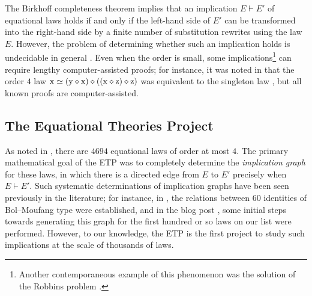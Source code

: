 The Birkhoff completeness theorem \cite[Th. 3.5.14]{term-rewriting} implies that an implication $E \vdash E'$ of equational laws holds if and only if the left-hand side of $E'$ can be transformed into the right-hand side by a finite number of substitution rewrites using the law $E$. However, the problem of determining whether such an implication holds is undecidable in general \cite{mckenzie}. Even when the order is small, some implications\footnote{Another contemporaneous example of this phenomenon was the solution of the Robbins problem \cite{robbins}.} can require lengthy computer-assisted proofs; for instance, it was noted in \cite{Kisielewicz2} that the order $4$ law $\mathrm{x} \simeq (\mathrm{y} \diamond \mathrm{x}) \diamond ((\mathrm{x} \diamond \mathrm{z}) \diamond \mathrm{z})$  was equivalent to the singleton law , but all known proofs are computer-assisted.

\subsection{The Equational Theories Project}

As noted in , there are $4694$ equational laws of order at most $4$. The primary mathematical goal of the ETP was to completely determine the \emph{implication graph} for these laws, in which there is a directed edge from $E$ to $E'$ precisely when $E \vdash E'$. Such systematic determinations of implication graphs have been seen previously in the literature; for instance, in \cite{phillips-vojtechovsky}, the relations between $60$ identities of Bol--Moufang type were established, and in the blog post \cite[\S 17]{Wolfram_2022}, some initial steps towards generating this graph for the first hundred or so laws on our list were performed. However, to our knowledge, the ETP is the first project to study such implications at the scale of thousands of laws.

